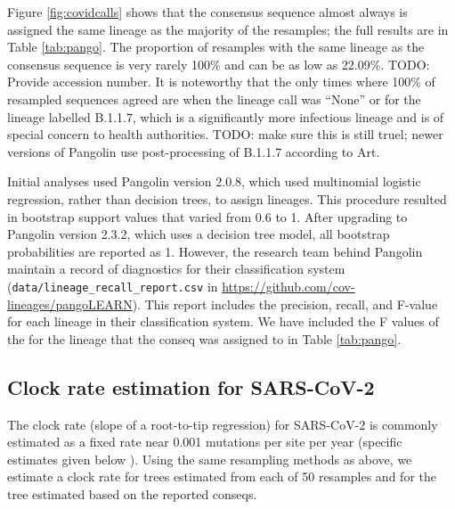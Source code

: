 \documentclass[10pt]{article}
\begin{document}
Figure \ref{fig:covidcalls} shows that the consensus sequence almost always is assigned the same lineage as the majority of the resamples; the full results are in Table \ref{tab:pango}.
The proportion of resamples with the same lineage as the consensus sequence is very rarely 100\% and can be as low as 22.09\%. TODO: Provide accession number.
It is noteworthy that the only times where 100\% of resampled sequences agreed are when the lineage call was ``None'' or for the lineage labelled B.1.1.7, which is a significantly more infectious lineage and is of special concern to health authorities. TODO: make sure this is still truel; newer versions of Pangolin use post-processing of B.1.1.7 according to Art.


Initial analyses used Pangolin version 2.0.8, which used multinomial logistic regression, rather than decision trees, to assign lineages.
This procedure resulted in bootstrap support values that varied from 0.6 to 1.
After upgrading to Pangolin version 2.3.2, which uses a decision tree model, all bootstrap probabilities are reported as 1.
However, the research team behind Pangolin maintain a record of diagnostics for their classification system (\texttt{data/lineage\_recall\_report.csv} in \url{https://github.com/cov-lineages/pangoLEARN}).
This report includes the precision, recall, and F-value for each lineage in their classification system.
We have included the F values of the for the lineage that the conseq was assigned to in Table \ref{tab:pango}.



\subsection{Clock rate estimation for SARS-CoV-2}

The clock rate (slope of a root-to-tip regression) for SARS-CoV-2 is commonly estimated as a fixed rate near 0.001 mutations per site per year (specific estimates given below ).
Using the same resampling methods as above, we estimate a clock rate for trees estimated from each of 50 resamples and for the tree estimated based on the reported conseqs.
\end{document}
